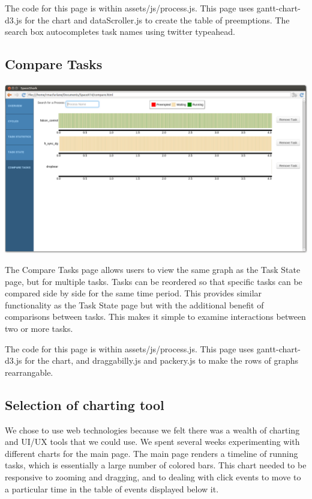 \documentclass{hmcclinic}
\begin{document}
    The code for this page is within assets/js/process.js. This page uses
    gantt-chart-d3.js for the chart and dataScroller.js to create the table of
    preemptions. The search box autocompletes task names using twitter
    typeahead.
  
  \subsection{Compare Tasks} %

  \includegraphics[scale=0.25]{compare-page.png}
 
The Compare Tasks page allows users to view the same graph as the Task State
page, but for multiple tasks. Tasks can be reordered so that specific tasks can
be compared side by side for the same time period. This provides similar
functionality as the Task State page but with the additional benefit of
comparisons between tasks. This makes it simple to examine interactions between
two or more tasks.

The code for this page is within assets/js/process.js. This page uses
    gantt-chart-d3.js for the chart, and draggabilly.js and packery.js to make the rows of graphs rearrangable.

\subsection{Selection of charting tool} %
  We chose to use web technologies because we felt there was a wealth of
  charting and UI/UX tools that we could use. We spent several weeks
  experimenting with different charts for the main page. The main page renders a
  timeline of running tasks, which is essentially a large number of colored
  bars. This chart needed to be responsive to zooming and dragging, and to
  dealing with click events to move to a particular time in the table of events
  displayed below it.
\end{document}
